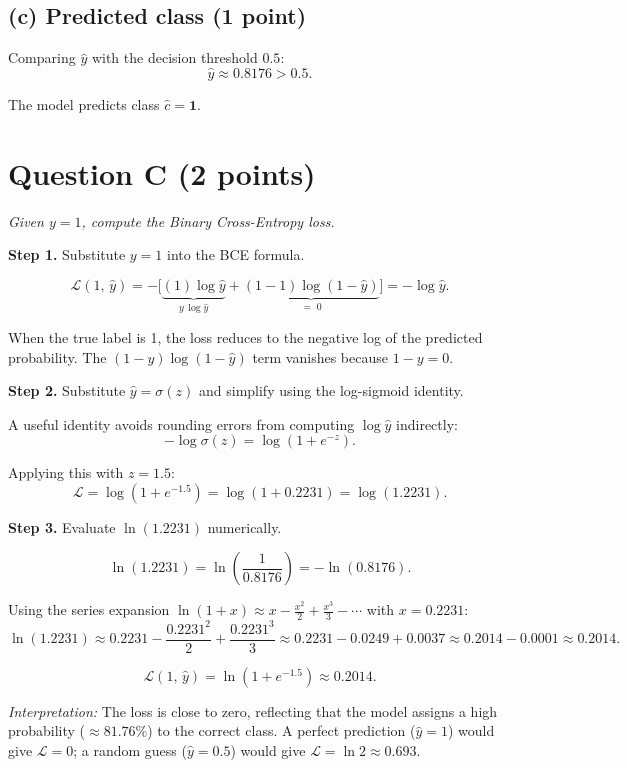 \documentclass[12pt,a4paper]{article}
\newcommand{\step}[1]{\medskip\noindent\textbf{\textsf{Step #1.}}\enspace}
\begin{document}
\bigskip
\subsection*{(c) Predicted class \hfill{\normalfont\small(1 point)}}

Comparing $\hat{y}$ with the decision threshold $0.5$:
\[
  \hat{y} \approx 0.8176 > 0.5.
\]

\begin{answerbox}
The model predicts class $\hat{c} = \mathbf{1}$.
\end{answerbox}

\section*{Question C \hfill{\normalfont\small(2 points)}}

\noindent\textit{Given $y = 1$, compute the Binary Cross-Entropy loss.}

\medskip

\step{1} Substitute $y = 1$ into the BCE formula.

\[
  \mathcal{L}(1,\,\hat{y})
  = -\bigl[\underbrace{(1)\log\hat{y}}_{y\,\log\hat{y}}
          + \underbrace{(1-1)\log(1-\hat{y})}_{=\;0}\bigr]
  = -\log\hat{y}.
\]

When the true label is 1, the loss reduces to the negative log of the
predicted probability.  The $(1-y)\log(1-\hat{y})$ term vanishes because
$1 - y = 0$.

\step{2} Substitute $\hat{y} = \sigma(z)$ and simplify using the
         log-sigmoid identity.

A useful identity avoids rounding errors from computing $\log \hat{y}$
indirectly:
\[
  -\log\sigma(z) = \log\!\left(1 + e^{-z}\right).
\]

Applying this with $z = 1.5$:
\[
  \mathcal{L}
  = \log\!\left(1 + e^{-1.5}\right)
  = \log(1 + 0.2231)
  = \log(1.2231).
\]

\step{3} Evaluate $\ln(1.2231)$ numerically.

\[
  \ln(1.2231)
  = \ln\!\left(\frac{1}{0.8176}\right)
  = -\ln(0.8176).
\]

Using the series expansion $\ln(1+x) \approx x - \tfrac{x^2}{2} +
\tfrac{x^3}{3} - \cdots$ with $x = 0.2231$:
\[
  \ln(1.2231) \approx 0.2231 - \frac{0.2231^2}{2} + \frac{0.2231^3}{3}
             \approx 0.2231 - 0.0249 + 0.0037
             \approx 0.2014 - 0.0001
             \approx 0.2014.
\]

\begin{answerbox}
\[
  \mathcal{L}(1,\,\hat{y}) = \ln(1 + e^{-1.5}) \approx \boxed{0.2014}.
\]
\end{answerbox}

\noindent\textit{Interpretation:} The loss is close to zero, reflecting that
the model assigns a high probability (${\approx}81.76\%$) to the correct class.
A perfect prediction ($\hat{y} = 1$) would give $\mathcal{L} = 0$; a random
guess ($\hat{y} = 0.5$) would give $\mathcal{L} = \ln 2 \approx 0.693$.
\end{document}

